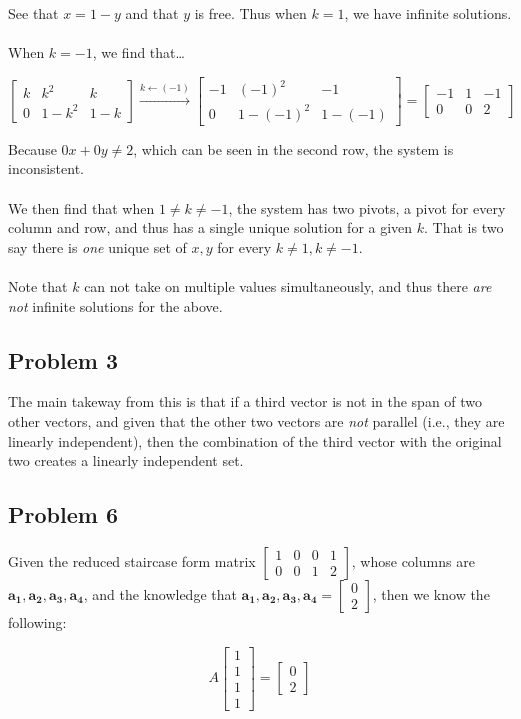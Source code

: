 \documentclass[12pt]{article}
\newcommand{\bm}[1]{\mathbf{{#1}}}
\newcommand{\mb}{\begin{bmatrix}}
\newcommand{\me}{\end{bmatrix}}
\begin{document}
See that $x = 1 - y$ and that $y$ is free. Thus when $k = 1$, we have infinite solutions. \\ \\

When $k = -1$, we find that\dots

$$\mb k & k^2 & k \\ 0 & 1 - k^2 & 1 -k \me \xrightarrow{k \leftarrow (-1)} \mb -1 & (-1)^2 & -1 \\ 0 & 1 - (-1)^2 & 1-(-1) \me = \mb -1 & 1 & -1 \\ 0 & 0 & 2 \me$$

Because $0x + 0y \neq 2$, which can be seen in the second row, the system is inconsistent. \\ \\

We then find that when $1 \neq k \neq -1$, the system has two pivots, a pivot for every column and row,
and thus has a single unique solution for a given $k$. That is two say there is \emph{one} unique set of $x, y$ for every $k \neq 1, k \neq -1$. \\ \\

Note that $k$ can not take on multiple values simultaneously, and thus there \emph{are not} infinite solutions for the above.

\subsection*{Problem 3}

The main takeway from this is that if a third vector is not in the span of two other vectors, and given that
the other two vectors are \emph{not} parallel (i.e., they are linearly independent), then the combination of the
third vector with the original two creates a linearly independent set.

\subsection*{Problem 6}

Given the reduced staircase form matrix $\mb 1 & 0 & 0 & 1 \\ 0 & 0 & 1 & 2 \me$, whose columns are $\bm{a_1, a_2, a_3, a_4}$,
and the knowledge that $\bm{a_1, a_2, a_3, a_4} = \mb 0 \\ 2 \me$, then we know the following:

$$A \mb 1\\1\\1\\1 \me = \mb 0\\2 \me$$
\end{document}
